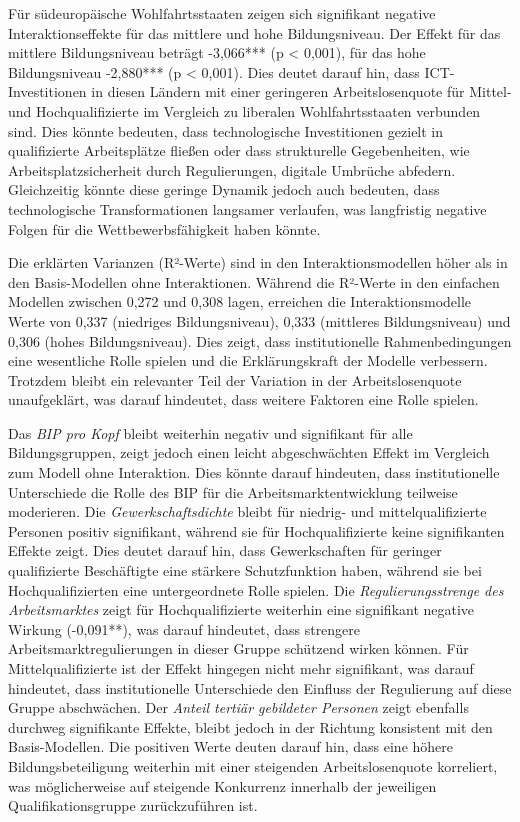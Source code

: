 Für südeuropäische Wohlfahrtsstaaten zeigen sich signifikant negative 
Interaktionseffekte für das mittlere und hohe Bildungsniveau. Der Effekt für das 
mittlere Bildungsniveau beträgt -3,066*** (p < 0,001), für das hohe Bildungsniveau 
-2,880*** (p < 0,001). Dies deutet darauf hin, dass \ac{ICT}-Investitionen in diesen 
Ländern mit einer geringeren Arbeitslosenquote für Mittel- und Hochqualifizierte im 
Vergleich zu liberalen Wohlfahrtsstaaten verbunden sind. Dies könnte bedeuten, dass 
technologische Investitionen gezielt in qualifizierte Arbeitsplätze fließen oder dass 
strukturelle Gegebenheiten, wie Arbeitsplatzsicherheit durch Regulierungen, digitale 
Umbrüche abfedern. Gleichzeitig könnte diese geringe Dynamik jedoch auch bedeuten, 
dass technologische Transformationen langsamer verlaufen, was langfristig negative 
Folgen für die Wettbewerbsfähigkeit haben könnte.

Die erklärten Varianzen (R²-Werte) sind in den Interaktionsmodellen höher als in den 
Basis-Modellen ohne Interaktionen. Während die R²-Werte in den einfachen Modellen 
zwischen 0,272 und 0,308 lagen, erreichen die Interaktionsmodelle Werte von 0,337 
(niedriges Bildungsniveau), 0,333 (mittleres Bildungsniveau) und 0,306 
(hohes Bildungsniveau). Dies zeigt, dass institutionelle Rahmenbedingungen eine 
wesentliche Rolle spielen und die Erklärungskraft der Modelle verbessern. Trotzdem 
bleibt ein relevanter Teil der Variation in der Arbeitslosenquote unaufgeklärt, 
was darauf hindeutet, dass weitere Faktoren eine Rolle spielen.

Das \textit{\ac{BIP} pro Kopf} bleibt weiterhin negativ und signifikant für alle 
Bildungsgruppen, zeigt jedoch einen leicht abgeschwächten Effekt im Vergleich zum 
Modell ohne Interaktion. Dies könnte darauf hindeuten, dass institutionelle 
Unterschiede die Rolle des BIP für die Arbeitsmarktentwicklung teilweise moderieren. 
Die \textit{Gewerkschaftsdichte} bleibt für niedrig- und mittelqualifizierte 
Personen positiv signifikant, während sie für Hochqualifizierte keine signifikanten 
Effekte zeigt. Dies deutet darauf hin, dass Gewerkschaften für geringer qualifizierte 
Beschäftigte eine stärkere Schutzfunktion haben, während sie bei Hochqualifizierten 
eine untergeordnete Rolle spielen. Die \textit{Regulierungsstrenge des Arbeitsmarktes} 
zeigt für Hochqualifizierte weiterhin eine signifikant negative Wirkung 
(-0,091**), was darauf hindeutet, dass strengere Arbeitsmarktregulierungen in dieser 
Gruppe schützend wirken können. Für Mittelqualifizierte ist der Effekt hingegen nicht 
mehr signifikant, was darauf hindeutet, dass institutionelle Unterschiede den 
Einfluss der Regulierung auf diese Gruppe abschwächen. Der 
\textit{Anteil tertiär gebildeter Personen} zeigt ebenfalls durchweg signifikante 
Effekte, bleibt jedoch in der Richtung konsistent mit den Basis-Modellen. Die 
positiven Werte deuten darauf hin, dass eine höhere Bildungsbeteiligung weiterhin 
mit einer steigenden Arbeitslosenquote korreliert, was möglicherweise auf steigende 
Konkurrenz innerhalb der jeweiligen Qualifikationsgruppe zurückzuführen ist.

